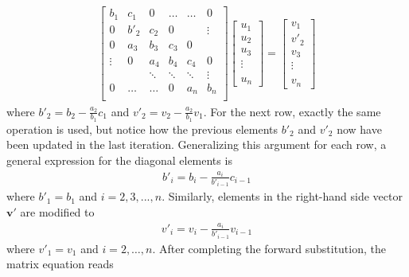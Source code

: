 \documentclass[a4paper,11pt, english, twoside]{article}
\begin{document}
\begin{align*}
  \begin{bmatrix}
    b_1 & c_1 & 0  & \hdots & \hdots &   0    \\
    0 & b'_2 & c_2 & 0      & &\vdots \\
    0 & a_3 & b_3  & c_3     & 0 &  \\
    \vdots & 0 & a_4  & b_4     & c_4 & 0 \\
    & & \ddots & \ddots & \ddots & \vdots\\
    0 & \hdots  &\hdots & 0 &a_n & b_n \\
  \end{bmatrix}
  \begin{bmatrix}
    u_1 \\ u_2 \\ u_3 \\ \vdots \\ \\ u_n
  \end{bmatrix}
  =
  \begin{bmatrix}
    v_1 \\ v'_2 \\ v_3 \\ \vdots \\ \\ v_n
  \end{bmatrix}
\end{align*}
where $b'_2 = b_2 - \frac{a_2}{b_1} c_1$ and $v'_2 = v_2 - \frac{a_2}{b_1}v_1$.
For the next row, exactly the same operation is used, but notice how the previous
elements $b'_2$ and $v'_2$ now have been updated in the last iteration. Generalizing this
argument for each row, a general expression for the diagonal elements is
\begin{align*}
  b'_i = b_i - \frac{a_i}{b'_{i-1}}c_{i-1}
\end{align*}
where $b'_1 = b_1$ and $i = 2,3,...,n$. Similarly, elements in the right-hand side vector
$\mathbf{v}'$ are modified to
\begin{align*}
  v'_{i} = v_i - \frac{a_i}{b'_{i-1}}v_{i-1}
\end{align*}
where $v'_1 = v_1$ and $i = 2,\hdots,n$. After completing the forward substitution,
the matrix equation reads
\end{document}
